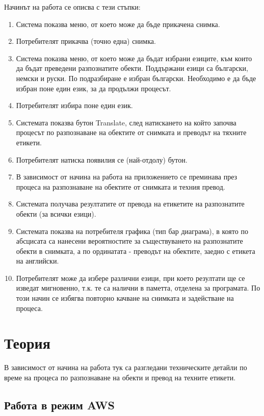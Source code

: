 \documentclass[12pt]{article}
\begin{document}
\noindent Начинът на работа се описва с тези стъпки:
\begin{enumerate}
    \item Система показва меню, от което може да бъде прикачена снимка.
    \item Потребителят прикачва (точно една) снимка.
    \item Система показва меню, от което може да бъдат избрани езиците, към които да бъдат преведени разпознатите обекти. Поддържани езици са български, немски и руски. По подразбиране е избран български. Необходимо е да бъде избран поне един език, за да продължи процесът.
    \item Потребителят избира поне един език.
    \item Системата показва бутон Translate, след натискането на който започва процесът по разпознаване на обектите от снимката и преводът на тяхните етикети.
    \item Потребителят натиска появилия се (най-отдолу) бутон.
    \item В зависимост от начина на работа на приложението се преминава през процеса на разпознаване на обектите от снимката и техния превод.
    \item Системата получава резултатите от превода на етикетите на разпознатите обекти (за всички езици).
    \item Системата показва на потребителя графика (тип бар диаграма), в която по абсцисата са нанесени вероятностите за съществуването на разпознатите обекти в снимката, а по ординатата - преводът на обектите, заедно с етикета на английски.
    \item Потребителят може да избере различни езици, при което резултати ще се изведат мигновенно, т.к. те са налични в паметта, отделена за програмата. По този начин се избягва повторно качване на снимката и задействане на процеса.
\end{enumerate}

\section{Теория}

\noindent В зависимост от начина на работа тук са разгледани техническите детайли по време на процеса по разпознаване на обекти и превод на техните етикети.

\subsection{Работа в режим AWS}
\end{document}
